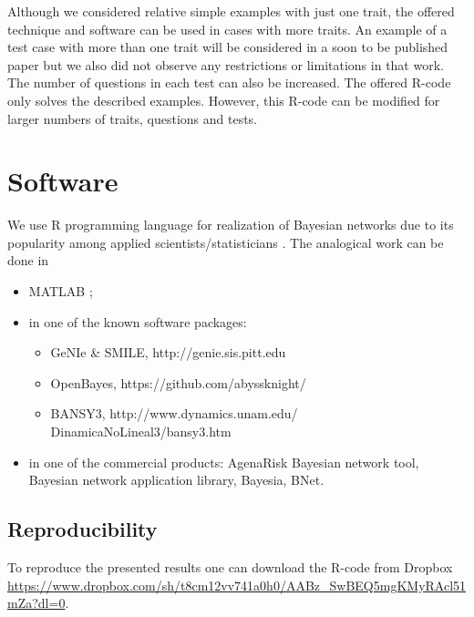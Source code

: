 \documentclass[12pt]{article}
\let\oldurl\url
\let\linkurl\url
\let\url\oldurl
\begin{document}
Although we considered relative simple examples with just one trait, the offered technique and software can be used in cases with more traits. An example of a test case with more than one trait will be considered in a soon to be published paper but we also did not observe any restrictions or limitations in that work. The number of questions in each test can also be increased. The offered R-code only solves the described examples. However, this R-code can be modified for larger numbers of traits, questions and tests. 
%
%
\section{Software}
We use R programming language for realization of Bayesian networks due to its popularity among applied scientists/statisticians \cite{Bu:10,Kab:14}. The analogical work can be done in 
\begin{itemize}
\item 
MATLAB \cite{Mur:01};
\item
in one of the known software packages:
\begin{itemize}
\item 
GeNIe \& SMILE, \mbox{http://genie.sis.pitt.edu}
\item
OpenBayes, \mbox{https://github.com/abyssknight/}
\item
BANSY3, \mbox{http://www.dynamics.unam.edu/}\\ \mbox{DinamicaNoLineal3/bansy3.htm}
\end{itemize}
\item in one of the commercial products: AgenaRisk Bayesian network tool, Bayesian network application library, Bayesia, BNet.
\end{itemize}
%
%
\subsection{Reproducibility} To reproduce the presented results one can download the R-code from Dropbox\\
  \linkurl{https://www.dropbox.com/sh/t8cm12vv741a0h0/AABz_SwBEQ5mgKMyRAcl51mZa?dl=0}.

%
%
\end{document}
